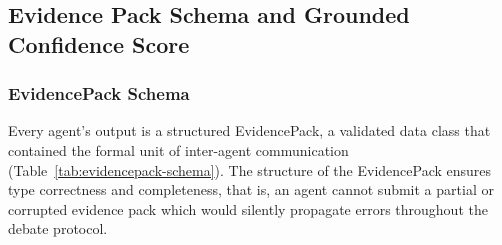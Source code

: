 \documentclass{article}
\begin{document}
\subsection{Evidence Pack Schema and Grounded Confidence Score}
\subsubsection{EvidencePack Schema}

Every agent's output is a structured EvidencePack, a validated data class that contained the formal unit of inter-agent communication (Table~\ref{tab:evidencepack-schema}). The structure of the EvidencePack ensures type correctness and completeness, that is, an agent cannot submit a partial or corrupted evidence pack which would silently propagate errors throughout the debate protocol. 

\small
\renewcommand{\arraystretch}{1.35}
\end{document}
